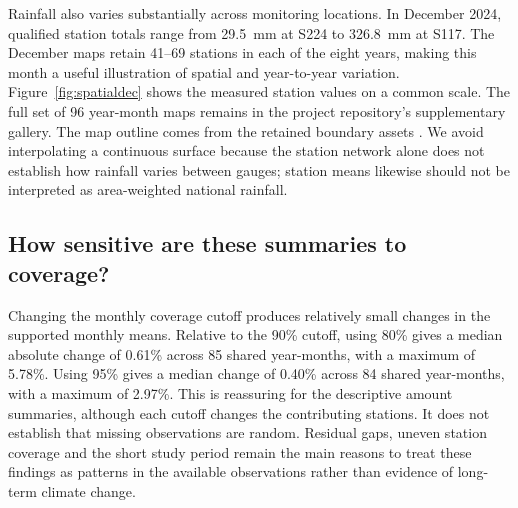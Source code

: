 
Rainfall also varies substantially across monitoring locations. In December 2024, qualified station totals range from 29.5~mm at S224 to 326.8~mm at S117. The December maps retain 41--69 stations in each of the eight years, making this month a useful illustration of spatial and year-to-year variation. Figure~\ref{fig:spatialdec} shows the measured station values on a common scale. The full set of 96 year-month maps remains in the project repository's supplementary gallery. The map outline comes from the retained boundary assets \cite{geo}. We avoid interpolating a continuous surface because the station network alone does not establish how rainfall varies between gauges; station means likewise should not be interpreted as area-weighted national rainfall.


\subsection{How sensitive are these summaries to coverage?}

Changing the monthly coverage cutoff produces relatively small changes in the supported monthly means. Relative to the 90\% cutoff, using 80\% gives a median absolute change of 0.61\% across 85 shared year-months, with a maximum of 5.78\%. Using 95\% gives a median change of 0.40\% across 84 shared year-months, with a maximum of 2.97\%. This is reassuring for the descriptive amount summaries, although each cutoff changes the contributing stations. It does not establish that missing observations are random. Residual gaps, uneven station coverage and the short study period remain the main reasons to treat these findings as patterns in the available observations rather than evidence of long-term climate change.
